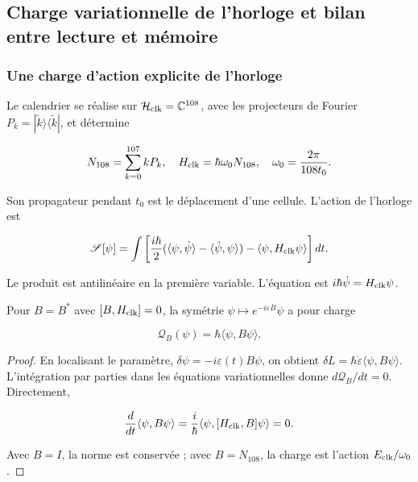 \subsection{Charge variationnelle de l’horloge et bilan entre lecture et mémoire
}

\subsubsection{Une charge d’action explicite de l’horloge
}

Le calendrier se réalise sur \(\mathcal H_{\rm clk}=\mathbb C^{108}\), avec les projecteurs de Fourier \(P_k=|\widetilde k\rangle\langle\widetilde k|\), et détermine


\begin{equation}
N_{108}=\sum_{k=0}^{107}kP_k,\quad
H_{\rm clk}=\hbar\omega_0N_{108},\quad
\omega_0=\frac{2\pi}{108t_0}.
\label{nuc07:eq:12}
\end{equation}

Son propagateur pendant \(t_0\) est le déplacement d’une cellule. L’action de l’horloge est

\begin{equation}
\mathscr S[\psi]=\int
\left[\frac{i\hbar}{2}
(\langle\psi,\dot\psi\rangle-\langle\dot\psi,\psi\rangle)
-\langle\psi,H_{\rm clk}\psi\rangle\right]dt.
\label{nuc07:eq:13}
\end{equation}

Le produit est antilinéaire en la première variable. L’équation est \(i\hbar\dot\psi=H_{\rm clk}\psi\).


\begin{proposition}
Pour \(B=B^*\) avec \([B,H_{\rm clk}]=0\), la symétrie \(\psi\mapsto e^{-i\varepsilon B}\psi\) a pour charge

\begin{equation}
\mathcal Q_B(\psi)=\hbar\langle\psi,B\psi\rangle.
\label{nuc07:eq:14}
\end{equation}
\end{proposition}

\begin{proof}
En localisant le paramètre, \(\delta\psi=-i\varepsilon(t)B\psi\), on obtient
\(\delta L=\hbar\dot\varepsilon\langle\psi,B\psi\rangle\).
L’intégration par parties dans les équations variationnelles donne \(d\mathcal Q_B/dt=0\). Directement,


\[
\frac{d}{dt}\langle\psi,B\psi\rangle
=\frac{i}{\hbar}\langle\psi,[H_{\rm clk},B]\psi\rangle=0.
\]

Avec \(B=I\), la norme est conservée ; avec \(B=N_{108}\), la charge est l’action \(E_{\rm clk}/\omega_0\).
\end{proof}

